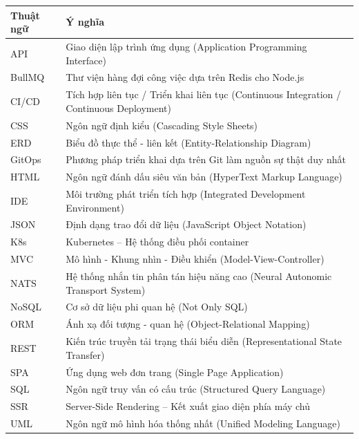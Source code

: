 \documentclass[13pt,a4paper,twoside]{report}
\begin{document}
\begin{longtable}{p{4cm} p{11cm}}
  \textbf{Thuật ngữ} & \textbf{Ý nghĩa} \\
  \hline
  API & Giao diện lập trình ứng dụng (Application Programming Interface) \\
  BullMQ & Thư viện hàng đợi công việc dựa trên Redis cho Node.js \\
  CI/CD & Tích hợp liên tục / Triển khai liên tục (Continuous Integration / Continuous Deployment) \\
  CSS & Ngôn ngữ định kiểu (Cascading Style Sheets) \\
  ERD & Biểu đồ thực thể - liên kết (Entity-Relationship Diagram) \\
  GitOps & Phương pháp triển khai dựa trên Git làm nguồn sự thật duy nhất \\
  HTML & Ngôn ngữ đánh dấu siêu văn bản (HyperText Markup Language) \\
  IDE & Môi trường phát triển tích hợp (Integrated Development Environment) \\
  JSON & Định dạng trao đổi dữ liệu (JavaScript Object Notation) \\
  K8s & Kubernetes -- Hệ thống điều phối container \\
  MVC & Mô hình - Khung nhìn - Điều khiển (Model-View-Controller) \\
  NATS & Hệ thống nhắn tin phân tán hiệu năng cao (Neural Autonomic Transport System) \\
  NoSQL & Cơ sở dữ liệu phi quan hệ (Not Only SQL) \\
  ORM & Ánh xạ đối tượng - quan hệ (Object-Relational Mapping) \\
  REST & Kiến trúc truyền tải trạng thái biểu diễn (Representational State Transfer) \\
  SPA & Ứng dụng web đơn trang (Single Page Application) \\
  SQL & Ngôn ngữ truy vấn có cấu trúc (Structured Query Language) \\
  SSR & Server-Side Rendering -- Kết xuất giao diện phía máy chủ \\
  UML & Ngôn ngữ mô hình hóa thống nhất (Unified Modeling Language) \\
\end{longtable}

\newpage

\end{document}
